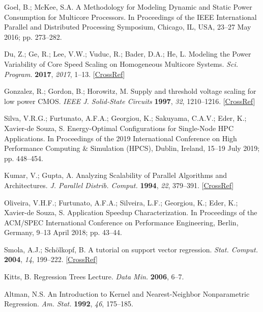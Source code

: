 \begin{thebibliography}{999}
	Goel, B.; McKee, S.A. A Methodology for Modeling Dynamic and Static Power Consumption for Multicore Processors. {In Proceedings of the IEEE International Parallel and Distributed Processing Symposium, Chicago, IL, USA, 23--27 May 2016}; pp. 273--282.
	
	Du, Z.; Ge, R.; Lee, V.W.; Vuduc, R.; Bader, D.A.; He, L. Modeling the Power Variability of Core Speed Scaling on Homogeneous Multicore Systems. {\em Sci. Program.} {\bf 2017}, {\em 2017}, 1--13. [\href{http://dx.doi.org/10.1155/2017/8686971}{CrossRef}]
	
	Gonzalez, R.; Gordon, B.; Horowitz, M. Supply and threshold voltage scaling for low power CMOS. {\em IEEE J. Solid-State Circuits} {\bf 1997}, {\em 32}, 1210--1216. [\href{http://dx.doi.org/10.1109/4.604077}{CrossRef}]
	
	Silva, V.R.G.; Furtunato, A.F.A.; Georgiou, K.; Sakuyama, C.A.V.; Eder, K.; Xavier-de Souza, S. Energy-Optimal Configurations for Single-Node HPC Applications. {In Proceedings of the  2019 International Conference on High Performance Computing \& Simulation (HPCS), Dublin, Ireland, 15--19 July 2019}; pp. 448--454.
	
	Kumar, V.; Gupta, A. Analyzing Scalability of Parallel Algorithms and Architectures. {\em J. Parallel  Distrib. Comput.} {\bf 1994}, {\em 22}, 379--391. [\href{http://dx.doi.org/10.1006/jpdc.1994.1099}{CrossRef}]
	
	Oliveira, V.H.F.; Furtunato, A.F.A.; Silveira, L.F.; Georgiou, K.; Eder, K.; Xavier-de Souza, S. Application Speedup Characterization. {In Proceedings of the ACM/SPEC International Conference on Performance Engineering, Berlin, Germany, 9--13 April 2018}; pp. 43--44.
	
	Smola, A.J.; Sch{\"{o}}lkopf, B. A tutorial on support vector regression. {\em Stat. Comput.} {\bf 2004}, {\em 14}, 199--222. [\href{http://dx.doi.org/10.1023/B:STCO.0000035301.49549.88}{CrossRef}]
	
	Kitts, B. Regression Trees Lecture. {\em Data Min.} {\bf 2006}, 6--7.
	
	Altman, N.S. An Introduction to Kernel and Nearest-Neighbor Nonparametric Regression. {\em  Am. Stat.} {\bf 1992}, {\em 46}, 175--185.
	

\end{thebibliography}
